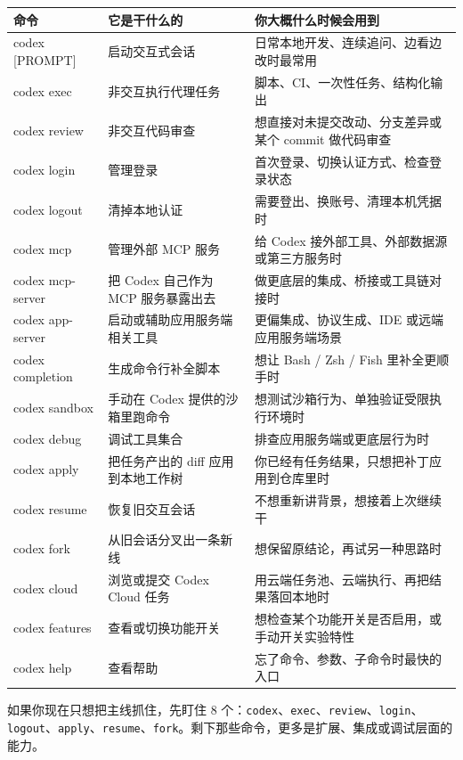 \documentclass[UTF8,a4paper,12pt]{ctexart}
\begin{document}
\begin{longtable}{>{\ttfamily\raggedright\arraybackslash}p{} >{\raggedright\arraybackslash}p{} >{\raggedright\arraybackslash}p{}}
\toprule
命令 & 它是干什么的 & 你大概什么时候会用到 \\
\midrule
\endhead
codex [PROMPT] & 启动交互式会话 & 日常本地开发、连续追问、边看边改时最常用 \\
codex exec & 非交互执行代理任务 & 脚本、CI、一次性任务、结构化输出 \\
codex review & 非交互代码审查 & 想直接对未提交改动、分支差异或某个 commit 做代码审查 \\
codex login & 管理登录 & 首次登录、切换认证方式、检查登录状态 \\
codex logout & 清掉本地认证 & 需要登出、换账号、清理本机凭据时 \\
codex mcp & 管理外部 MCP 服务 & 给 Codex 接外部工具、外部数据源或第三方服务时 \\
codex mcp-server & 把 Codex 自己作为 MCP 服务暴露出去 & 做更底层的集成、桥接或工具链对接时 \\
codex app-server & 启动或辅助应用服务端相关工具 & 更偏集成、协议生成、IDE 或远端应用服务端场景 \\
codex completion & 生成命令行补全脚本 & 想让 Bash / Zsh / Fish 里补全更顺手时 \\
codex sandbox & 手动在 Codex 提供的沙箱里跑命令 & 想测试沙箱行为、单独验证受限执行环境时 \\
codex debug & 调试工具集合 & 排查应用服务端或更底层行为时 \\
codex apply & 把任务产出的 diff 应用到本地工作树 & 你已经有任务结果，只想把补丁应用到仓库里时 \\
codex resume & 恢复旧交互会话 & 不想重新讲背景，想接着上次继续干 \\
codex fork & 从旧会话分叉出一条新线 & 想保留原结论，再试另一种思路时 \\
codex cloud & 浏览或提交 Codex Cloud 任务 & 用云端任务池、云端执行、再把结果落回本地时 \\
codex features & 查看或切换功能开关 & 想检查某个功能开关是否启用，或手动开关实验特性 \\
codex help & 查看帮助 & 忘了命令、参数、子命令时最快的入口 \\
\bottomrule
\end{longtable}

\begin{tipbox}
如果你现在只想把主线抓住，先盯住 8 个：\texttt{codex}、\texttt{exec}、\texttt{review}、\texttt{login}、\texttt{logout}、\texttt{apply}、\texttt{resume}、\texttt{fork}。剩下那些命令，更多是扩展、集成或调试层面的能力。
\end{tipbox}
\end{document}

